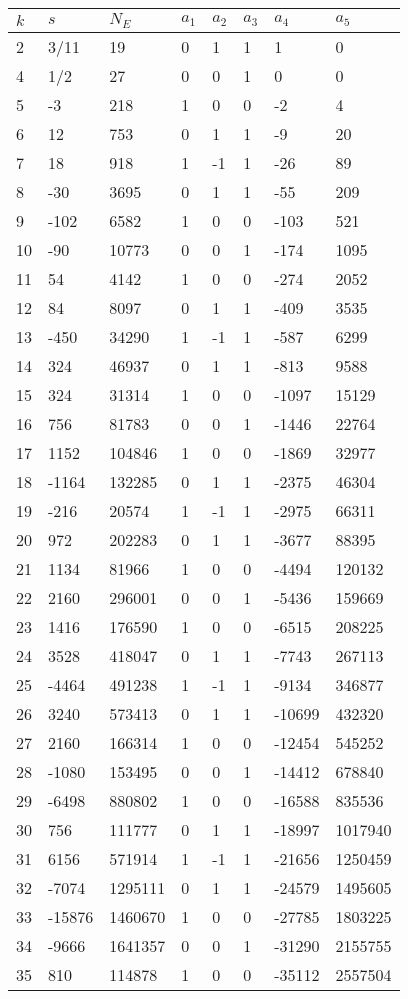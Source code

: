 \documentclass{amsart}
\begin{document}
\begin{longtable}{|l|l|l|lllll|}
\hline
$k$ & $s$ & $N_E$ & $a_1$ & $a_2$ & $a_3$ & $a_4$ & $a_5$\\
\hline
2&3/11&19&0&1&1&1&0\\
4&1/2&27&0&0&1&0&0\\
5&-3&218&1&0&0&-2&4\\
6&12&753&0&1&1&-9&20\\
7&18&918&1&-1&1&-26&89\\
8&-30&3695&0&1&1&-55&209\\
9&-102&6582&1&0&0&-103&521\\
10&-90&10773&0&0&1&-174&1095\\
11&54&4142&1&0&0&-274&2052\\
12&84&8097&0&1&1&-409&3535\\
13&-450&34290&1&-1&1&-587&6299\\
14&324&46937&0&1&1&-813&9588\\
15&324&31314&1&0&0&-1097&15129\\
16&756&81783&0&0&1&-1446&22764\\
17&1152&104846&1&0&0&-1869&32977\\
18&-1164&132285&0&1&1&-2375&46304\\
19&-216&20574&1&-1&1&-2975&66311\\
20&972&202283&0&1&1&-3677&88395\\
21&1134&81966&1&0&0&-4494&120132\\
22&2160&296001&0&0&1&-5436&159669\\
23&1416&176590&1&0&0&-6515&208225\\
24&3528&418047&0&1&1&-7743&267113\\
25&-4464&491238&1&-1&1&-9134&346877\\
26&3240&573413&0&1&1&-10699&432320\\
27&2160&166314&1&0&0&-12454&545252\\
28&-1080&153495&0&0&1&-14412&678840\\
29&-6498&880802&1&0&0&-16588&835536\\
30&756&111777&0&1&1&-18997&1017940\\
31&6156&571914&1&-1&1&-21656&1250459\\
32&-7074&1295111&0&1&1&-24579&1495605\\
33&-15876&1460670&1&0&0&-27785&1803225\\
34&-9666&1641357&0&0&1&-31290&2155755\\
35&810&114878&1&0&0&-35112&2557504\\

\end{longtable}
\end{document}
